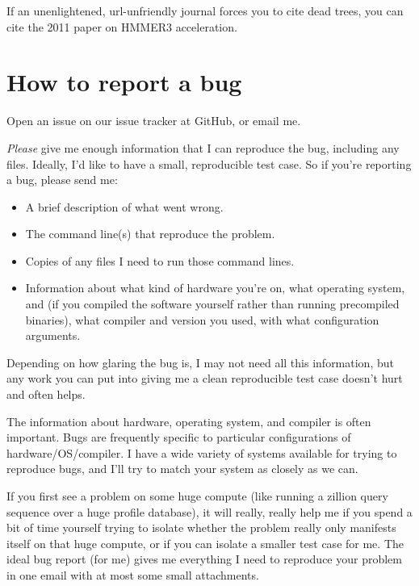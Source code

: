 If an unenlightened, url-unfriendly journal forces you to cite dead
trees, you can cite the 2011 paper on HMMER3
acceleration.\cite{Eddy11}



\section{How to report a bug}

Open an issue on our issue tracker at GitHub,
or email me.

\emph{Please} give me enough information that I can reproduce the
bug, including any files.  Ideally, I'd like to have a small,
reproducible test case.  So if you're reporting a bug, please send me:

\begin{itemize}
 \item A brief description of what went wrong.
 \item The command line(s) that reproduce the problem.
 \item Copies of any files I need to run those command lines.
 \item Information about what kind of hardware you're on, what
   operating system, and (if you compiled the software yourself rather
   than running precompiled binaries), what compiler and version you
   used, with what configuration arguments.
\end{itemize}

Depending on how glaring the bug is, I may not need all this
information, but any work you can put into giving me a clean
reproducible test case doesn't hurt and often helps.

The information about hardware, operating system, and compiler is
often important. Bugs are frequently specific to particular
configurations of hardware/OS/compiler.  I have a wide variety of
systems available for trying to reproduce bugs, and I'll try to match
your system as closely as we can.

If you first see a problem on some huge compute (like running a
zillion query sequence over a huge profile database), it will really,
really help me if you spend a bit of time yourself trying to isolate
whether the problem really only manifests itself on that huge compute,
or if you can isolate a smaller test case for me. The ideal bug report
(for me) gives me everything I need to reproduce your problem in one
email with at most some small attachments.  

